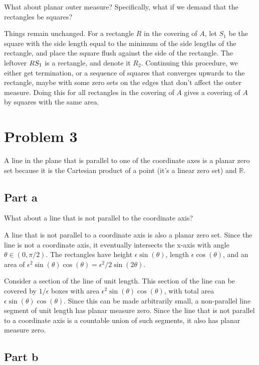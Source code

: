 \documentclass{article}
\newcommand{\R}{\mathbb{R}}
\begin{document}
What about planar outer measure? Specifically, what if we demand that the rectangles be squares?

Things remain unchanged. For a rectangle $R$ in the covering of $A$, let $S_1$ be the square with the side length equal to the minimum of the side lengths of the rectangle, and place the square flush against the side of the rectangle. The leftover $R\\S_1$ is a rectangle, and denote it $R_2$. Continuing this procedure, we either get termination, or a sequence of squares that converges upwards to the rectangle, maybe with some zero sets on the edges that don't affect the outer measure. Doing this for all rectangles in the covering of $A$ gives a covering of $A$ by squares with the same area.

\section*{Problem 3}

A line in the plane that is parallel to one of the coordinate axes is a planar zero set because it is the Cartesian product of a point (it's a linear zero set) and $\R$.

\subsection*{Part a}

What about a line that is not parallel to the coordinate axis?

A line that is not parallel to a coordinate axis is also a planar zero set. Since the line is not a coordinate axis, it eventually intersects the x-axis with angle $\theta \in (0, \pi/2)$. The rectangles have height $\epsilon \sin(\theta)$, length $\epsilon \cos(\theta)$, and an area of $\epsilon^2 \sin(\theta) \cos(\theta) = \epsilon^2/2 \sin(2\theta)$.

Consider a section of the line of unit length. This section of the line can be covered by $1/\epsilon$ boxes with area $\epsilon^2 \sin(\theta) \cos(\theta)$, with total area $\epsilon \sin(\theta) \cos(\theta)$. Since this can be made arbitrarily small, a non-parallel line segment of unit length has planar measure zero. Since the line that is not parallel to a coordinate axis is a countable union of such segments, it also has planar measure zero.

\subsection*{Part b}
\end{document}
